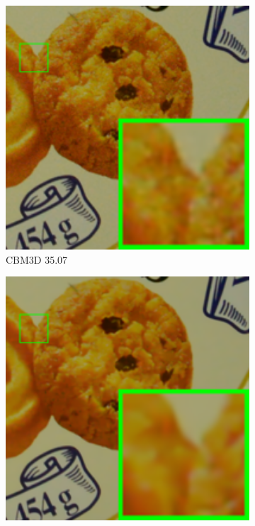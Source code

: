 \begin{figure}
\begin{subfigure}[t]{0.19\textwidth}
        \includegraphics[width=1\textwidth]{images/mcwnnm/cc/resize_br_CBM3D_CC15_d600_iso3200_2.png}
		\caption{CBM3D 35.07}
    \end{subfigure}
    \hfill
    \begin{subfigure}[t]{0.19\textwidth}
        \centering
        \includegraphics[width=1\textwidth]{images/mcwnnm/cc/resize_br_TRD_CC15_d600_iso3200_2.png}

\end{subfigure}
\end{figure}
